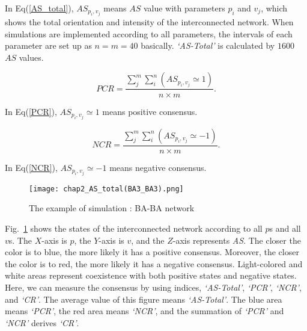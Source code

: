 In Eq(\ref{AS_total}), ${A{S_{{p _i},{v _j}}}}$ means $AS$ value with parameters $p_i$ and $v_j$, which shows the total orientation and intensity of the interconnected network. When simulations are implemented according to all parameters, the intervals of each parameter are set up as $n = m = 40$ basically. \textit{`AS-Total'} is calculated by $1600$ $AS$ values.   

\begin{equation}
PCR = \frac{{\sum\limits_j^m {\sum\limits_i^n {(A{S_{{p _i},{v _j}}} \simeq  1)} } }}{{n \times m}}.
\label{PCR}
\end{equation}

In Eq(\ref{PCR}),  ${A{S_{{p _i},{v _j}}} \simeq  1}$ means positive consensus.

\begin{equation}
NCR = \frac{{\sum\limits_j^m {\sum\limits_i^n {(A{S_{{p _i},{v _j}}} \simeq   - 1)} } }}{{n \times m}}.
\label{NCR}
\end{equation}

In Eq(\ref{NCR}), ${A{S_{{p _i},{v _j}}} \simeq  -1}$ means negative consensus.


\begin{figure}[!htb]
	\centering
	\texttt{[image: chap2\_AS\_total(BA3\_BA3).png]}
	\caption{The example of simulation : BA-BA network}
	\label{chap2_AS_total(BA3_BA3)}
\end{figure}

Fig.~\ref{chap2_AS_total(BA3_BA3)} shows the states of the interconnected network according to all $p$s and all $v$s. The $X$-axis is $p$, the $Y$-axis is $v$, and the $Z$-axis represents \textit{AS}. The closer the color is to blue, the more likely it has a positive consensus. Moreover, the closer the color is to red, the more likely it has a negative consensus. Light-colored and white areas represent coexistence with both positive states and negative states. Here, we can measure the consensus by using indices, \textit{`AS-Total'}, \textit{`PCR'}, \textit{`NCR'}, and \textit{`CR'}. The average value of this figure means \textit{`AS-Total'}. The blue area means \textit{`PCR'}, the red area means \textit{`NCR'}, and the summation of \textit{`PCR'} and \textit{`NCR'} derives \textit{`CR'}. \\



    
